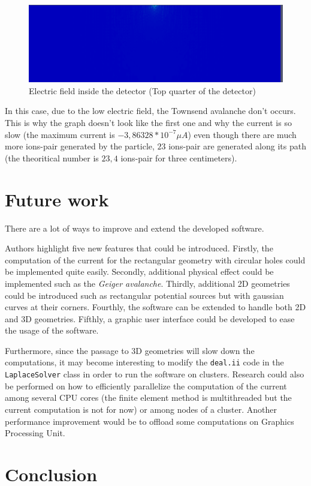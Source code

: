 \documentclass[11pt]{article}
\begin{document}
			\begin{figure}[H]
			  \center
			  \includegraphics[scale=0.4]{images/applications/electric_field.png}
			  \caption{Electric field inside the detector (Top quarter of the detector)}
			  \label{fig:electric_field}
			\end{figure}

			In this case, due to the low electric field, the Townsend avalanche don't occurs. This is why the graph doesn't
			look like the first one and why the current is so slow (the maximum current is $-3,86328*10^{-7}\mu A$) even though
			there are much more ions-pair generated by the particle, $23$ ions-pair are generated along its path (the theoritical
			number is $23,4$ ions-pair for three centimeters).

\section{Future work}

There are a lot of ways to improve and extend the developed software.

Authors highlight five new features that could be introduced. Firstly, the
computation of the current for the
rectangular geometry with circular holes could be implemented quite easily.
Secondly, additional physical effect
could be implemented such as the \textit{Geiger avalanche}. Thirdly,
additional 2D geometries could be introduced such as
rectangular potential sources but with gaussian curves at their corners.
Fourthly, the software can be extended to handle both 2D and 3D geometries.
Fifthly, a graphic user interface could be developed to ease the usage of the
software.

Furthermore, since the passage to 3D geometries will slow down the computations,
it may become interesting to modify the \texttt{deal.ii} code in the
\texttt{LaplaceSolver} class in order to run the software on clusters.
Research could also be performed on how to efficiently parallelize the
computation of the current among several CPU cores (the finite element method
is multithreaded but the current computation is not for now) or among nodes of a cluster.
Another performance improvement would be to offload some computations on
Graphics Processing Unit.

\section*{Conclusion}

\newpage



\end{document}
